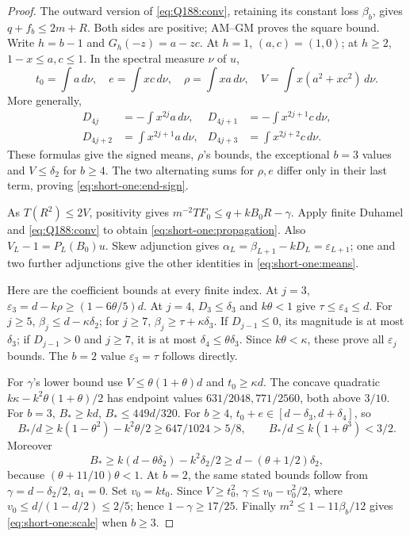 \begin{proof}
The outward version of \eqref{eq:Q188:conv}, retaining its constant
loss \(\beta_b\), gives \(q+f_b\le2m+R\). Both sides are positive;
AM--GM proves the square bound. Write \(h=b-1\) and
\(G_h(-z)=a-zc\). At \(h=1\), \((a,c)=(1,0)\); at \(h\ge2\),
\(1-x\le a,c\le1\). In the spectral measure \(\nu\) of \(u\),
\[
 t_0=\int a\,d\nu,\quad e=\int xc\,d\nu,\quad
 \rho=\int xa\,d\nu,\quad V=\int x(a^2+xc^2)\,d\nu .
\]
More generally,
\[
\begin{aligned}
 D_{4j}&=-\int x^{2j}a\,d\nu,&
 D_{4j+1}&=-\int x^{2j+1}c\,d\nu,\\
 D_{4j+2}&=\int x^{2j+1}a\,d\nu,&
 D_{4j+3}&=\int x^{2j+2}c\,d\nu .
\end{aligned}
\]
These formulas give the signed means, \(\rho\)'s bounds, the exceptional
\(b=3\) values and \(V\le\delta_2\) for \(b\ge4\).
The two alternating sums for \(\rho,e\) differ only in their last
term, proving \eqref{eq:short-one:end-sign}.

As \(T(R^2)\le2V\), positivity gives
\(m^{-2}TF_0\le q+kB_0R-\gamma\).
Apply finite Duhamel and \eqref{eq:Q188:conv} to obtain
\eqref{eq:short-one:propagation}. Also \(V_L-1=P_L(B_0)u\).
Skew adjunction gives
\(\alpha_L=\beta_{L+1}-kD_L=\varepsilon_{L+1}\);
one and two further adjunctions give the other identities in
\eqref{eq:short-one:means}.

Here are the coefficient bounds at every finite index.
At \(j=3\), \(\varepsilon_3=d-k\rho\ge(1-6\theta/5)d\).
At \(j=4\), \(D_3\le\delta_3\) and \(k\theta<1\) give
\(\tau\le\varepsilon_4\le d\).
For \(j\ge5\), \(\beta_j\le d-\kappa\delta_2\);
for \(j\ge7\), \(\beta_j\ge\tau+\kappa\delta_3\).
If \(D_{j-1}\le0\), its magnitude is at most \(\delta_3\);
if \(D_{j-1}>0\) and \(j\ge7\), it is at most
\(\delta_4\le\theta\delta_3\). Since \(k\theta<\kappa\),
these prove all \(\varepsilon_j\) bounds. The \(b=2\) value
\(\varepsilon_3=\tau\) follows directly.

For \(\gamma\)'s lower bound use
\(V\le\theta(1+\theta)d\) and \(t_0\ge\kappa d\).
The concave quadratic \(k\kappa-k^2\theta(1+\theta)/2\) has endpoint
values \(631/2048,771/2560\), both above \(3/10\).
For \(b=3\), \(B_*\ge kd\), \(B_*\le449d/320\).
For \(b\ge4\), \(t_0+e\in[d-\delta_3,d+\delta_4]\), so
\[
 B_*/d\ge k(1-\theta^2)-k^2\theta/2\ge647/1024>5/8,\qquad
 B_*/d\le k(1+\theta^3)<3/2 .
\]
Moreover
\[
 B_*\ge k(d-\theta\delta_2)-k^2\delta_2/2
 \ge d-(\theta+1/2)\delta_2,
\]
because \((\theta+11/10)\theta<1\).
At \(b=2\), the same stated bounds follow from
\(\gamma=d-\delta_2/2\), \(a_1=0\).
Set \(v_0=kt_0\). Since \(V\ge t_0^2\),
\(\gamma\le v_0-v_0^2/2\), where
\(v_0\le d/(1-d/2)\le2/5\); hence \(1-\gamma\ge17/25\).
Finally \(m^2\le1-11\beta_b/12\) gives
\eqref{eq:short-one:scale} when \(b\ge3\).


\end{proof}
